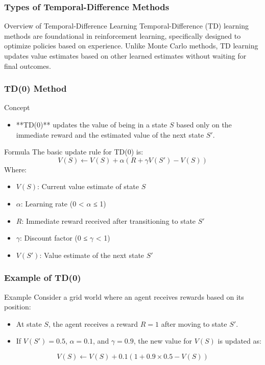 \documentclass[aspectratio=169]{beamer}
\begin{document}
\begin{frame}[fragile]
    \frametitle{Types of Temporal-Difference Methods}
    \begin{block}{Overview of Temporal-Difference Learning}
        Temporal-Difference (TD) learning methods are foundational in reinforcement learning, specifically designed to optimize policies based on experience. Unlike Monte Carlo methods, TD learning updates value estimates based on other learned estimates without waiting for final outcomes. 
    \end{block}
\end{frame}

\begin{frame}[fragile]
    \frametitle{TD(0) Method}
    \begin{block}{Concept}
        \begin{itemize}
            \item **TD(0)** updates the value of being in a state $S$ based only on the immediate reward and the estimated value of the next state $S'$.
        \end{itemize}
    \end{block}
    
    \begin{block}{Formula}
        The basic update rule for TD(0) is:
        \[
        V(S) \leftarrow V(S) + \alpha \left( R + \gamma V(S') - V(S) \right)
        \]
        Where:
        \begin{itemize}
            \item $V(S)$: Current value estimate of state $S$
            \item $\alpha$: Learning rate (0 < $\alpha$ ≤ 1)
            \item $R$: Immediate reward received after transitioning to state $S'$
            \item $\gamma$: Discount factor (0 ≤ $\gamma$ < 1)
            \item $V(S')$: Value estimate of the next state $S'$
        \end{itemize}
    \end{block}
\end{frame}

\begin{frame}[fragile]
    \frametitle{Example of TD(0)}
    \begin{block}{Example}
        Consider a grid world where an agent receives rewards based on its position:
        \begin{itemize}
            \item At state $S$, the agent receives a reward $R = 1$ after moving to state $S'$.
            \item If $V(S') = 0.5$, $\alpha = 0.1$, and $\gamma = 0.9$, the new value for $V(S)$ is updated as:
        \end{itemize}
        \[
        V(S) \leftarrow V(S) + 0.1 \left( 1 + 0.9 \times 0.5 - V(S) \right)
        \]
    \end{block}
\end{frame}
\end{document}

